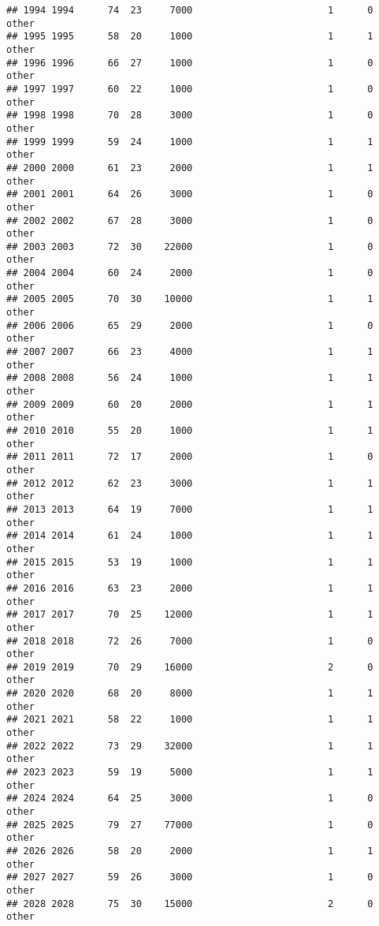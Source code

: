 \documentclass[
]{article}
\begin{document}
\begin{verbatim}
## 1994 1994      74  23     7000                        1      0    other
## 1995 1995      58  20     1000                        1      1    other
## 1996 1996      66  27     1000                        1      0    other
## 1997 1997      60  22     1000                        1      0    other
## 1998 1998      70  28     3000                        1      0    other
## 1999 1999      59  24     1000                        1      1    other
## 2000 2000      61  23     2000                        1      1    other
## 2001 2001      64  26     3000                        1      0    other
## 2002 2002      67  28     3000                        1      0    other
## 2003 2003      72  30    22000                        1      0    other
## 2004 2004      60  24     2000                        1      0    other
## 2005 2005      70  30    10000                        1      1    other
## 2006 2006      65  29     2000                        1      0    other
## 2007 2007      66  23     4000                        1      1    other
## 2008 2008      56  24     1000                        1      1    other
## 2009 2009      60  20     2000                        1      1    other
## 2010 2010      55  20     1000                        1      1    other
## 2011 2011      72  17     2000                        1      0    other
## 2012 2012      62  23     3000                        1      1    other
## 2013 2013      64  19     7000                        1      1    other
## 2014 2014      61  24     1000                        1      1    other
## 2015 2015      53  19     1000                        1      1    other
## 2016 2016      63  23     2000                        1      1    other
## 2017 2017      70  25    12000                        1      1    other
## 2018 2018      72  26     7000                        1      0    other
## 2019 2019      70  29    16000                        2      0    other
## 2020 2020      68  20     8000                        1      1    other
## 2021 2021      58  22     1000                        1      1    other
## 2022 2022      73  29    32000                        1      1    other
## 2023 2023      59  19     5000                        1      1    other
## 2024 2024      64  25     3000                        1      0    other
## 2025 2025      79  27    77000                        1      0    other
## 2026 2026      58  20     2000                        1      1    other
## 2027 2027      59  26     3000                        1      0    other
## 2028 2028      75  30    15000                        2      0    other

\end{verbatim}
\end{document}

